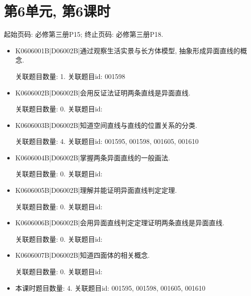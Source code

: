 \section*{第6单元, 第6课时}
起始页码: 必修第三册P15; 终止页码: 必修第三册P18.
\begin{itemize}
\item K0606001B|D06002B|通过观察生活实景与长方体模型, 抽象形成异面直线的概念.

关联题目数量: 1. 关联题目id: 001598

\item K0606002B|D06002B|会用反证法证明两条直线是异面直线.

关联题目数量: 0. 关联题目id: 

\item K0606003B|D06002B|知道空间直线与直线的位置关系的分类.

关联题目数量: 4. 关联题目id: 001595, 001598, 001605, 001610

\item K0606004B|D06002B|掌握两条异面直线的一般画法.

关联题目数量: 0. 关联题目id: 

\item K0606005B|D06002B|理解并能证明异面直线判定定理.

关联题目数量: 0. 关联题目id: 

\item K0606006B|D06002B|会用异面直线判定定理证明两条直线是异面直线.

关联题目数量: 0. 关联题目id: 

\item K0606007B|D06002B|知道四面体的相关概念.

关联题目数量: 0. 关联题目id: 

\item 本课时题目数量: 4. 关联题目id: 001595, 001598, 001605, 001610

\end{itemize}

